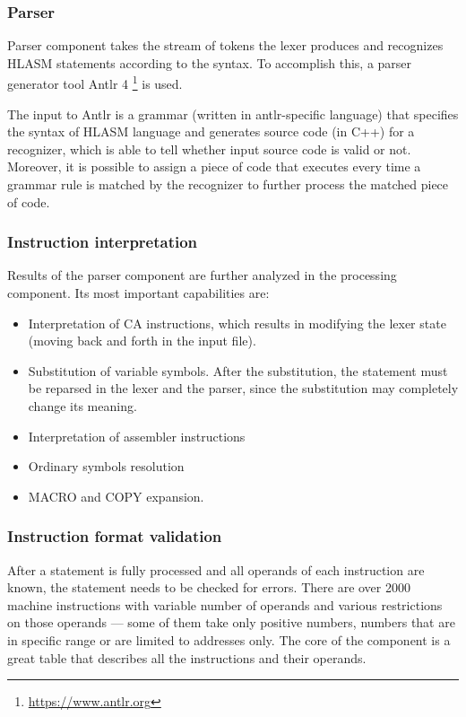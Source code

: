 \subsubsection{Parser}

Parser component takes the stream of tokens the lexer produces and recognizes HLASM statements according to the syntax. To accomplish this, a parser generator tool Antlr 4 \footnote{\url{https://www.antlr.org}} is used.

The input to Antlr is a grammar (written in antlr-specific language) that specifies the syntax of HLASM language and generates source code (in C++) for a recognizer, which is able to tell whether input source code is valid or not. Moreover, it is possible to assign a piece of code that executes every time a grammar rule is matched by the recognizer to further process the matched piece of code.

\subsubsection{Instruction interpretation}

Results of the parser component are further analyzed in the processing component. Its most important capabilities are:
\begin{itemize}
	\item Interpretation of CA instructions, which results in modifying the lexer state (moving back and forth in the input file).
	\item Substitution of variable symbols. After the substitution, the statement must be reparsed in the lexer and the parser, since the substitution may completely change its meaning.
	\item Interpretation of assembler instructions
	\item Ordinary symbols resolution
	\item MACRO and COPY expansion.
\end{itemize}

\subsubsection{Instruction format validation}
After a statement is fully processed and all operands of each instruction are known, the statement needs to be checked for errors. There are over 2000 machine instructions with variable number of operands and various restrictions on those operands --- some of them take only positive numbers, numbers that are in specific range or are limited to addresses only. The core of the component is a great table that describes all the instructions and their operands.

